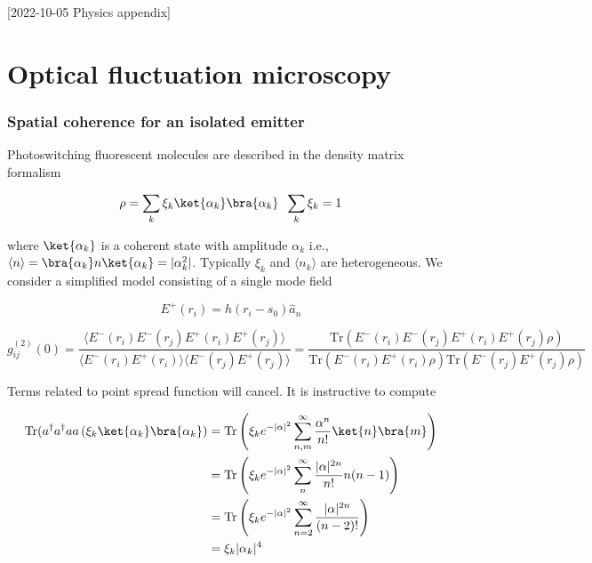 [2022-10-05 Physics appendix]

\chapter{Optical fluctuation microscopy}

\subsection{Spatial coherence for an isolated emitter}

Photoswitching fluorescent molecules are described in the density matrix formalism

\begin{equation*}
\rho = \sum_{k}\xi_{k}\ket{\alpha_{k}}\bra{\alpha_{k}}\;\; \sum_{k}\xi_{k} = 1
\end{equation*}


where $\ket{\alpha_{k}}$ is a coherent state with amplitude $\alpha_{k}$ i.e., $\langle n\rangle = \bra{\alpha_{k}} n\ket{\alpha_{k}} = \lvert\alpha_{k}^{2}\rvert$. Typically $\xi_{k}$ and $\langle n_{k}\rangle$ are heterogeneous. We consider a simplified model consisting of a single mode field 

\begin{equation*}
E^{+}(r_{i}) = h(r_{i}-s_{0})\hat{a}_{n}
\end{equation*}

\begin{equation*}
g^{(2)}_{ij}(0) = \frac{\langle E^{-}(r_{i})E^{-}(r_{j})E^{+}(r_{i})E^{+}(r_{j}) \rangle}{\langle E^{-}(r_{i})E^{+}(r_{i})\rangle\langle E^{-}(r_{j})E^{+}(r_{j})\rangle} = \frac{\mathrm{Tr}(E^{-}(r_{i})E^{-}(r_{j})E^{+}(r_{i})E^{+}(r_{j})\rho)}{\mathrm{Tr}(E^{-}(r_{i})E^{+}(r_{i})\rho)\mathrm{Tr}(E^{-}(r_{j})E^{+}(r_{j})\rho)}
\end{equation*}

Terms related to point spread function will cancel. It is instructive to compute

\begin{align*}
\mathrm{Tr}(a^{\dagger}a^{\dagger}aa \left(\xi_{k}\ket{\alpha_{k}}\bra{\alpha_{k}}\right) &= \mathrm{Tr}\left(\xi_{k} e^{-\lvert\alpha\rvert^{2}}\sum_{n,m}^{\infty}\frac{\alpha^{n}}{n!}\ket{n}\bra{m}\right)\\
&= \mathrm{Tr}\left(\xi_{k} e^{-\lvert\alpha\rvert^{2}}\sum_{n}^{\infty}\frac{\lvert\alpha\rvert^{2n}}{n!}n(n-1)\right)\\
&= \mathrm{Tr}\left(\xi_{k} e^{-\lvert\alpha\rvert^{2}}\sum_{n=2}^{\infty}\frac{\lvert\alpha\rvert^{2n}}{(n-2)!}\right)\\
&= \xi_{k}\lvert\alpha_{k}\rvert^{4}
\end{align*}

